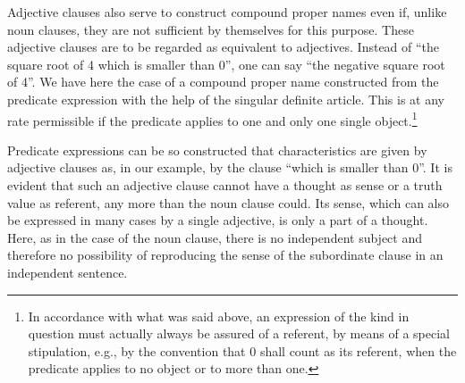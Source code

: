 \documentclass[twoside,12pt]{article}
\begin{document}
Adjective clauses also serve to construct compound proper names even
if, unlike noun clauses, they are not sufficient by themselves for
this purpose. These adjective clauses are to be regarded as equivalent
to adjectives. Instead of ``the square root of 4 which is smaller than
0'', one can say ``the negative square root of 4''. We have here the
case of a compound proper name constructed from the predicate
expression with the help of the singular definite article. This is at
any rate permissible if the predicate applies to one and only one
single object.\footnote[9]{In accordance with what was said above, an
  expression of the kind in question must actually always be assured
  of a referent, by means of a special stipulation, e.g., by the
  convention that 0 shall count as its referent, when the predicate
  applies to no object or to more than one.}

Predicate expressions can be so constructed that characteristics are
given by adjective clauses as, in our example, by the clause ``which
is smaller than 0''. It is evident that such an adjective clause
cannot have a thought as sense or a truth value as referent, any more
than the noun clause could. Its sense, which can also be expressed in
many cases by a single adjective, is only a part of a thought. Here,
as in the case of the noun clause, there is no independent subject and
therefore no possibility of reproducing the sense of the subordinate
clause in an independent sentence.
\end{document}
